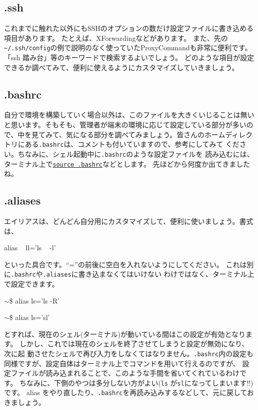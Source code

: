 \documentclass[a4j]{ltjreport}
\begin{document}
    \subsection{.ssh}
    これまでに触れた以外にもSSHのオプションの数だけ設定ファイルに書き込める項目があります。
    たとえば、XForwardingなどがあります。
    また、先の\verb|~/.ssh/config|の例で説明のなく使っていたProxyCommandも非常に便利です。
    「ssh 踏み台」等のキーワードで検索するよいでしょう。
    どのような項目が設定できるか調べてみて、便利に使えるようにカスタマイズしていきましょう。

    \subsection{.bashrc}
    自分で環境を構築していく場合以外は、このファイルを大きくいじることは無い
    と思います。そもそも、管理者が端末の環境に応じて設定している部分が多いの
    で、中を見てみて、気になる部分を調べてみましょう。皆さんのホームディレク
    トリにある\verb+.bashrc+は、コメントも付いていますので、参考にしてみて
    ください。ちなみに、シェル起動中に\verb+.bashrc+のような設定ファイルを
    読み込むには、ターミナル上で\underline{\texttt{source .bashrc}}などとします。
    先ほどから何度か出てきましたね。

    \subsection{.aliases}
    エイリアスは、どんどん自分用にカスタマイズして、便利に使いましょう。書式
    は、
    \begin{shadebox}
        alias ~ ll='ls ~ -l'
    \end{shadebox}
    といった具合です。``=''の前後に空白を入れないようにしてください。
    これは別に\verb+.bashrc+や\verb+.aliases+に書き込まなくてはいけない
    わけではなく、ターミナル上で設定できます。
    \begin{screen}
        $\sim$\$ alias  ls='ls -R'
    \end{screen}

    \begin{screen}
        $\sim$\$ alias   ls='sl'
    \end{screen}
    とすれば、現在のシェル(ターミナル)が動いている間はこの設定が有効となります。
    しかし、これでは現在のシェルを終了させてしまうと設定が無効になり、次に起
    動させたシェルで再び入力をしなくてはなりません。\verb+.bashrc+内の設定も
    同様ですが、設定自体はターミナル上でコマンドを用いて行えるのですが、
    設定ファイルが読み込まれることで、このような手間を省いてくれているわけです。
    ちなみに、下側のやつは多分しない方がよい(\verb+ls+ が\verb+sl+になってしまいます!!)です。
    alias をやり直したり、\verb+.bashrc+を再読み込みするなどして、元に戻しておきましょう。
\end{document}
